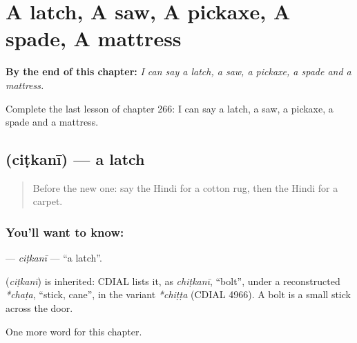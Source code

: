 
\chapter{A latch, A saw, A pickaxe, A spade, A mattress}
\label{ch:hi-a-latch-a-saw-a-pickaxe-a-spade-a-mattress}

\begin{chapteropening}
\textbf{By the end of this chapter:} \emph{I can say a latch, a saw, a pickaxe, a spade and a mattress.}

Complete the last lesson of chapter 266: I can say a latch, a saw, a pickaxe, a spade and a mattress.
\end{chapteropening}

\section[\texorpdfstring{\hi{चिटकनी} (ciṭkanī)}{चिटकनी (ciṭkanī)}]{ (ciṭkanī) — a latch}

\label{lesson:HI-C266-citkani}



\begin{quote}
Before the new one: say the Hindi for a cotton rug, then the Hindi for a carpet.
\end{quote}

\subsection*{You'll want to know: }
\textbf{} — \emph{ciṭkanī} — \textquotedblleft{}a latch\textquotedblright{}.

\begin{cousinweb}
\textbf{} (\emph{ciṭkanī}) is inherited: CDIAL lists it, as \emph{chiṭkanī}, \textquotedblleft{}bolt\textquotedblright{}, under a reconstructed \emph{*chaṭa}, \textquotedblleft{}stick, cane\textquotedblright{}, in the variant \emph{*chiṭṭa} (CDIAL 4966). A bolt is a small stick across the door.
\end{cousinweb}

\begin{grammarlens}[title={What you've built}]
One more word for this chapter.
\end{grammarlens}

